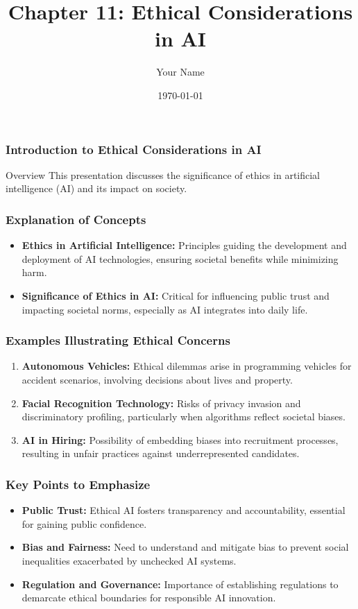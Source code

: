 \documentclass{beamer}
\title{Chapter 11: Ethical Considerations in AI}
\author{Your Name}
\institute{Your Institution}
\date{\today}
\begin{document}
\frame{\titlepage}

\begin{frame}[fragile]
    \frametitle{Introduction to Ethical Considerations in AI}
    \begin{block}{Overview}
        This presentation discusses the significance of ethics in artificial intelligence (AI) and its impact on society.
    \end{block}
\end{frame}

\begin{frame}[fragile]
    \frametitle{Explanation of Concepts}
    \begin{itemize}
        \item \textbf{Ethics in Artificial Intelligence:} 
            Principles guiding the development and deployment of AI technologies, ensuring societal benefits while minimizing harm.
        \item \textbf{Significance of Ethics in AI:} 
            Critical for influencing public trust and impacting societal norms, especially as AI integrates into daily life.
    \end{itemize}
\end{frame}

\begin{frame}[fragile]
    \frametitle{Examples Illustrating Ethical Concerns}
    \begin{enumerate}
        \item \textbf{Autonomous Vehicles:} 
            Ethical dilemmas arise in programming vehicles for accident scenarios, involving decisions about lives and property.
        \item \textbf{Facial Recognition Technology:} 
            Risks of privacy invasion and discriminatory profiling, particularly when algorithms reflect societal biases.
        \item \textbf{AI in Hiring:} 
            Possibility of embedding biases into recruitment processes, resulting in unfair practices against underrepresented candidates.
    \end{enumerate}
\end{frame}

\begin{frame}[fragile]
    \frametitle{Key Points to Emphasize}
    \begin{itemize}
        \item \textbf{Public Trust:} 
            Ethical AI fosters transparency and accountability, essential for gaining public confidence.
        \item \textbf{Bias and Fairness:} 
            Need to understand and mitigate bias to prevent social inequalities exacerbated by unchecked AI systems.
        \item \textbf{Regulation and Governance:} 
            Importance of establishing regulations to demarcate ethical boundaries for responsible AI innovation.
    \end{itemize}
\end{frame}
\end{document}
